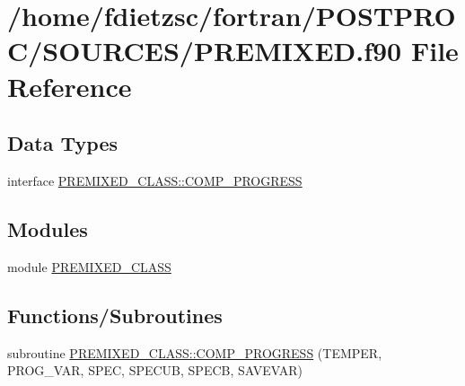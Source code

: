 \hypertarget{PREMIXED_8f90}{
\section{/home/fdietzsc/fortran/POSTPROC/SOURCES/PREMIXED.f90 File Reference}
\label{PREMIXED_8f90}
}
\subsection*{Data Types}
\begin{DoxyCompactItemize}
\item 
interface \hyperlink{interfacePREMIXED__CLASS_1_1COMP__PROGRESS}{PREMIXED\_\-CLASS::COMP\_\-PROGRESS}
\end{DoxyCompactItemize}
\subsection*{Modules}
\begin{DoxyCompactItemize}
\item 
module \hyperlink{namespacePREMIXED__CLASS}{PREMIXED\_\-CLASS}
\end{DoxyCompactItemize}
\subsection*{Functions/Subroutines}
\begin{DoxyCompactItemize}
\item 
subroutine \hyperlink{namespacePREMIXED__CLASS_a8e8fde9973a06836544f2e0171177fff}{PREMIXED\_\-CLASS::COMP\_\-PROGRESS} (TEMPER, PROG\_\-VAR, SPEC, SPECUB, SPECB, SAVEVAR)
\end{DoxyCompactItemize}
